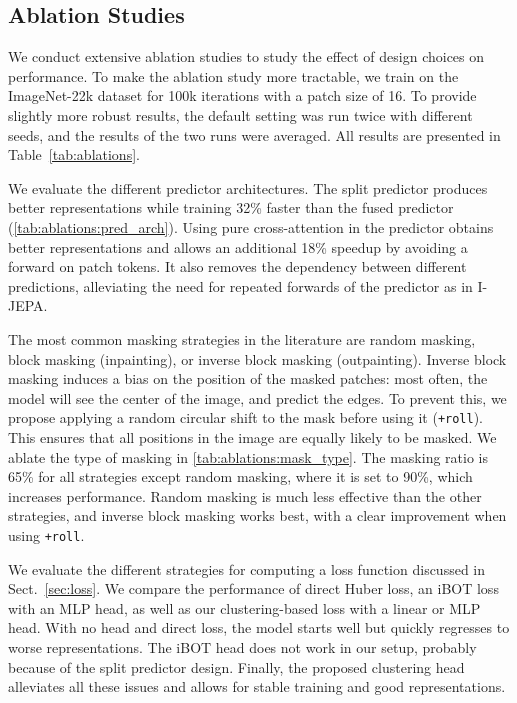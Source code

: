 \subsection{Ablation Studies}
\label{sec:ablation}
We conduct extensive ablation studies to study the effect of design choices on performance.
To make the ablation study more tractable, we train on the ImageNet-22k dataset for 100k iterations with a patch size of 16.
To provide slightly more robust results, the default setting was run twice with different seeds, and the results of the two runs were averaged.
All results are presented in Table~\ref{tab:ablations}.


We evaluate the different predictor architectures.
The split predictor produces better representations while training 32\% faster than the fused predictor (\cref{tab:ablations:pred_arch}).
Using pure cross-attention in the predictor obtains better representations and allows an additional 18\% speedup by avoiding a forward on patch tokens.
It also removes the dependency between different predictions, alleviating the need for repeated forwards of the predictor as in I-JEPA.

The most common masking strategies in the literature are random masking, block masking (inpainting), or inverse block masking (outpainting).
Inverse block masking induces a bias on the position of the masked patches: most often, the model will see the center of the image, and predict the edges.
To prevent this, we propose applying a random circular shift to the mask before using it (\texttt{+roll}).
This ensures that all positions in the image are equally likely to be masked.
We ablate the type of masking in \cref{tab:ablations:mask_type}.
The masking ratio is 65\% for all strategies except random masking, where it is set to 90\%, which increases performance.
Random masking is much less effective than the other strategies, and inverse block masking works best, with a clear improvement when using \texttt{+roll}.

We evaluate the different strategies for computing a loss function discussed in Sect.~\ref{sec:loss}.
We compare the performance of direct Huber loss, an iBOT loss with an MLP head, as well as our clustering-based loss with a linear or MLP head.
With no head and direct loss, the model starts well but quickly regresses to worse representations.
The iBOT head does not work in our setup, probably because of the split predictor design.
Finally, the proposed clustering head alleviates all these issues and allows for stable training and good representations.



